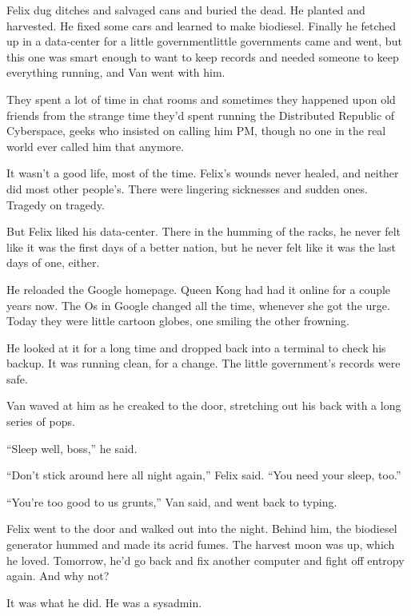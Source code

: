 Felix dug ditches and salvaged cans and buried the dead. He planted
and harvested. He fixed some cars and learned to make biodiesel.
Finally he fetched up in a data-center for a little
government\dash{}little governments came and went, but this one was smart
enough to want to keep records and needed someone to keep
everything running, and Van went with him.

They spent a lot of time in chat rooms and sometimes they happened
upon old friends from the strange time they’d spent running the
Distributed Republic of Cyberspace, geeks who insisted on calling
him PM, though no one in the real world ever called him that
anymore.

It wasn’t a good life, most of the time. Felix’s wounds never
healed, and neither did most other people’s. There were lingering
sicknesses and sudden ones. Tragedy on tragedy.

But Felix liked his data-center. There in the humming of the racks,
he never felt like it was the first days of a better nation, but he
never felt like it was the last days of one, either.

He reloaded the Google homepage. Queen Kong had had it online for a
couple years now. The Os in Google changed all the time, whenever
she got the urge. Today they were little cartoon globes, one
smiling the other frowning.

He looked at it for a long time and dropped back into a terminal to
check his backup. It was running clean, for a change. The little
government’s records were safe.

Van waved at him as he creaked to the door, stretching out his back
with a long series of pops.

“Sleep well, boss,” he said.

“Don’t stick around here all night again,” Felix said. “You need
your sleep, too.”

“You’re too good to us grunts,” Van said, and went back to typing.

Felix went to the door and walked out into the night. Behind him,
the biodiesel generator hummed and made its acrid fumes. The
harvest moon was up, which he loved. Tomorrow, he’d go back and fix
another computer and fight off entropy again. And why not?

It was what he did. He was a sysadmin.

